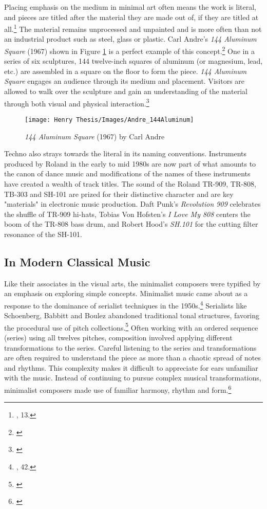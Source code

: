\documentclass[12pt,twoside]{reedthesis}
\begin{document}
Placing emphasis on the medium in minimal art often means the work is literal, and pieces are titled after the material they are made out of, if they are titled at all.\footnote{\cite{batchelorMinimalism1997}, 13.} The material remains unprocessed and unpainted and is more often than not an industrial product such as steel, glass or plastic. Carl Andre's \emph{144 Aluminum Square} (1967) shown in Figure \ref{fig:carl} is a perfect example of this concept.\footnote{\cite{andre144AluminumSquare1967}} One in a series of six sculptures, 144 twelve-inch squares of aluminum (or magnesium, lead, etc.) are assembled in a square on the floor to form the piece. \emph{144 Aluminum Square} engages an audience through its medium and placement. Visitors are allowed to walk over the sculpture and gain an understanding of the material through both visual and physical interaction.\footnote{\cite{144MagnesiumSquare}}

\begin{figure}[htbp]
\begin{centering} 
\texttt{[image: Henry Thesis/Images/Andre\_144Aluminum]}
\caption{\emph{144 Aluminum Square} (1967) by Carl Andre}
\label{fig:carl}
\end{centering} 
\end{figure}

Techno also strays towards the literal in its naming conventions. Instruments produced by Roland in the early to mid 1980s are now part of what amounts to the canon of dance music and modifications of the names of these instruments have created a wealth of track titles. The sound of the Roland TR-909, TR-808, TB-303 and SH-101 are prized for their distinctive character and are key "materials" in electronic music production. Daft Punk's \emph{Revolution 909} celebrates the shuffle of TR-909 hi-hats, Tobias Von Hofsten's \emph{I Love My 808} centers the boom of the TR-808 bass drum, and Robert Hood's \emph{SH.101} for the cutting filter resonance of the SH-101.

\subsection{In Modern Classical Music}
Like their associates in the visual arts, the minimalist composers were typified by an emphasis on exploring simple concepts. Minimalist music came about as a response to the dominance of serialist techniques in the 1950s.\footnote{\cite{obendorfMinimalismDesigningSimplicity2009}, 42.} Serialists like Schoenberg, Babbitt and Boulez abandoned traditional tonal structures, favoring the procedural use of pitch collections.\footnote{\cite{Serialism}} Often working with an ordered sequence (series) using all twelves pitches, composition involved applying different transformations to the series. Careful listening to the series and transformations are often required to understand the piece as more than a chaotic spread of notes and rhythms. This complexity makes it difficult to appreciate for ears unfamiliar with the music. Instead of continuing to pursue complex musical transformations, minimalist composers made use of familiar harmony, rhythm and form.\footnote{\cite{potterMinimalismUSA2019}}
\end{document}
